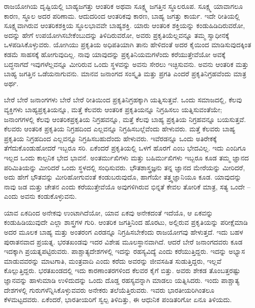 \vskip 5pt

ರಾಜಯೋಗಿಯ ದೃಷ್ಟಿಯಲ್ಲಿ ಬಾಹ್ಯಜಗತ್ತು ಆಂತರಿಕ ಅಥವಾ ಸೂಕ್ಷ್ಮ ಜಗತ್ತಿನ ಸ್ಥೂಲರೂಪ. ಸೂಕ್ಷ್ಮ ಯಾವಾಗಲೂ ಕಾರಣ, ಸ್ಥೂಲ ಅದರ ಪರಿಣಾಮ. ಆದುದರಿಂದ ಆಂತರಿಕವು ಕಾರಣ, ಬಾಹ್ಯ ಜಗತ್ತು ಕಾರ್ಯ. ಇದೇ ರೀತಿಯಲ್ಲಿ ಸೂಕ್ಷ್ಮವಾಗಿರುವ ಆಂತರಿಕಶಕ್ತಿಯ ಸ್ಥೂಲಭಾವವೇ ಬಾಹ್ಯಶಕ್ತಿ. ಯಾರು ಆಂತರಿಕ ಶಕ್ತಿಯನ್ನು ಕಂಡುಹಿಡಿದಿರುವರೋ, ಅದನ್ನು ಹೇಗೆ ಉಪಯೋಗಿಸಬೇಕೆಂಬುದನ್ನು ತಿಳಿದಿರುವರೋ, ಅವರು ಪ್ರಕೃತಿಯೆಲ್ಲವನ್ನೂ ತಮ್ಮ ಸ್ವಾಧೀನಕ್ಕೆ ಒಳಪಡಿಸಿಕೊಳ್ಳುವರು. ಯೋಗಿಯು ಪ್ರಕೃತಿಯ ಅಧಿಪತಿಯಾಗಿ ತಾನು ಹೇಳಿದಂತೆ ಅದರ ಕೈಯಿಂದ ಮಾಡಿಸುವುದಕ್ಕಿಂತ ಕಡಮೆ ಸಾಹಸಕ್ಕೆ ಹೋಗುವುದಿಲ್ಲ. ನಾವು ಯಾವುದನ್ನು ಪ್ರಕೃತಿನಿಯಮಗಳೆಂದು ಕರೆಯುತ್ತೇವೆಯೋ ಅವಕ್ಕೆ ಬದ್ಧನಾಗದೆ ಇವುಗಳೆಲ್ಲವನ್ನೂ ಮೀರಿರುವ ಒಂದು ಸ್ಥಳವನ್ನು ಅವನು ಸೇರಲು ಇಚ್ಛಿಸುವನು. ಅವನು ಆಂತರಿಕ ಮತ್ತು ಬಾಹ್ಯ ಜಗತ್ತಿನ ಒಡೆಯನಾಗುವನು. ಮಾನವ ಜನಾಂಗದ ಸಂಸ್ಕೃತಿ ಮತ್ತು ಪ್ರಗತಿ ಎಂದರೆ ಪ್ರಕೃತಿನಿಗ್ರಹವೆಂದು ಮಾತ್ರ ಅರ್ಥ. 

\vskip 6pt

ಬೇರೆ ಬೇರೆ ಜನಾಂಗಗಳು ಬೇರೆ ಬೇರೆ ರೀತಿಯಿಂದ ಪ್ರಕೃತಿನಿಗ್ರಹಕ್ಕಾಗಿ ಯತ್ನಿಸುತ್ತವೆ. ಒಂದು ಸಮಾಜದಲ್ಲಿ, ಕೆಲವು ವ್ಯಕ್ತಿಗಳು ಬಾಹ್ಯಪ್ರಕೃತಿಯನ್ನೂ, ಮತ್ತೆ ಕೆಲವರು ಆಂತರಿಕ ಪ್ರಕೃತಿಯನ್ನೂ ನಿಗ್ರಹಿಸಲು ಯತ್ನಿಸುವಂತೆಯೇ; ಜನಾಂಗಗಳಲ್ಲಿ ಕೆಲವು ಆಂತರಿಕಪ್ರಕೃತಿಯ ನಿಗ್ರಹವನ್ನೂ, ಮತ್ತೆ ಕೆಲವು ಬಾಹ್ಯ ಪ್ರಕೃತಿಯ ನಿಗ್ರಹವನ್ನೂ ಬಯಸುತ್ತವೆ. ಕೆಲವರು ಆಂತರಿಕ ಪ್ರಕೃತಿಯ ನಿಗ್ರಹದಿಂದ ಎಲ್ಲವನ್ನೂ ನಿಗ್ರಹಿಸಬಲ್ಲೆವೆಂದು ಹೇಳುವರು. ಮತ್ತೆ ಕೆಲವರು ಬಾಹ್ಯ ಪ್ರಕೃತಿಯ ನಿಗ್ರಹದಿಂದ ಎಲ್ಲವನ್ನೂ ನಿಗ್ರಹಿಸಬಹುದೆಂದು ಹೇಳುವರು. ಇವೆರಡನ್ನೂ ಒಂದು ಅತಿರೇಕಕ್ಕೆ ತೆಗೆದುಕೊಂಡುಹೋದರೆ ಇಬ್ಬರೂ ಸರಿ. ಏಕೆಂದರೆ ಪ್ರಕೃತಿಯಲ್ಲಿ ಒಳಗೆ ಹೊರಗೆ ಎಂಬ ಭೇದವಿಲ್ಲ. ಇದು ಎಂದಿಗೂ ಇಲ್ಲದ ಒಂದು ಕಾಲ್ಪನಿಕ ಭೇದ ಭಾವನೆ. ಅಂತರ್ಮುಖಿಗಳು ಮತ್ತು ಬಹಿರ್ಮುಖಿಗಳು ಇಬ್ಬರೂ ಕೂಡ ತಮ್ಮ ಜ್ಞಾನದ ಪರಿಮಿತಿಯನ್ನು ಮೀರಿದರೆ ಒಂದು ಸ್ಥಳದಲ್ಲಿ ಸಂಧಿಸುವರು. ಭೌತಶಾಸ್ತ್ರಜ್ಞನು ತನ್ನ ಜ್ಞಾನದ ಮೇರೆಯನ್ನು ಮೀರಿದರೆ, ಅದು ಹೇಗೆ ಭೌತವನ್ನು ಮೀರಿಹೋಗುವಂತೆ ಕಂಡುಬರುವುದೊ, ಹಾಗೆಯೇ ತತ್ತ್ವಜ್ಞಾನಿಯೂ ಕೂಡ. ಯಾವುದನ್ನು ನಾವು ಜಡ ಮತ್ತು ಚೇತನ ಎಂದು ಕರೆಯುತ್ತೇವೆಯೊ ಅವುಗಳಿಗಿರುವ ಭಿನ್ನತೆ ಕೇವಲ ತೋರಿಕೆ ಮಾತ್ರ, ಸತ್ಯ ಒಂದೇ – ಎಂದು ಅವನು ಕಂಡುಕೊಳ್ಳುವನು. 

\vskip 6pt

ಯಾವ ಏಕದಿಂದ ಅನೇಕವು ಉಂಟಾಗಿದೆಯೋ, ಯಾವ ಏಕವು ಅನೇಕದಂತೆ ಇದೆಯೊ, ಆ ಏಕವನ್ನು ಕಂಡುಹಿಡಿಯುವುದೇ ಎಲ್ಲಾ ಶಾಸ್ತ್ರಗಳ ಗುರಿ. ಆಂತರಿಕ ಜಗತ್ತಿನಿಂದ ಹೊರಟು, ಅಲ್ಲಿರುವ ಪ್ರಕೃತಿಯನ್ನು ಪರೀಕ್ಷೆಮಾಡಿ ಅದರ ಮೂಲಕ ಬಾಹ್ಯ ಮತ್ತು ಅಂತರಂಗ ಎರಡನ್ನೂ ನಿಗ್ರಹಿಸಬೇಕೆಂದು ರಾಜಯೋಗವು ಹೇಳುತ್ತದೆ. ಇದು ಬಹಳ ಪುರಾತನವಾದ ಪ್ರಯತ್ನ. ಭರತಖಂಡವು ಇದರ ವಿಶೇಷ ಮೂಲಸ್ಥಾನವಾಗಿದೆ. ಆದರೆ ಬೇರೆ ಜನಾಂಗದವರು ಕೂಡ ಇದಕ್ಕಾಗಿ ಪ್ರಯತ್ನಪಟ್ಟಿರುವರು. ಪಾಶ್ಚಾತ್ಯದೇಶಗಳಲ್ಲಿ ಇದನ್ನು ರಹಸ್ಯವಿದ್ಯೆ ಎಂದು ಕರೆಯುತ್ತಿದ್ದರು. ಇದನ್ನು ಅಭ್ಯಾಸ ಮಾಡುವವರನ್ನು ಮಾಟಗಾತಿ, ಮಂತ್ರವಾದಿ ಎಂದು ಕರೆದು ಅವರನ್ನು ಜೀವಸಹಿತ ಸುಡುತ್ತಿದ್ದರು, ಇಲ್ಲವೆ ಕೊಲ್ಲುತ್ತಿದ್ದರು. ಭರತಖಂಡದಲ್ಲಿ ಇದು ಕಾರಣಾಂತರಗಳಿಂದ ಕೆಲವರ ಕೈಗೆ ಬಿತ್ತು. ಅವರು ಶೇಕಡ ತೊಂಬತ್ತರಷ್ಟು ಜ್ಞಾನವನ್ನು ಹಾಳುಮಾಡಿ ಉಳಿದುದನ್ನು ಒಂದು ದೊಡ್ಡ ರಹಸ್ಯವನ್ನಾಗಿ ಮಾಡಲು ಯತ್ನಿಸಿದರು. ಇಂದು ಪಾಶ್ಚಾತ್ಯ ದೇಶಗಳಲ್ಲಿ ಗುರುಗಳೆನ್ನಿಸಿಕೊಳ್ಳುವವರು ಅನೇಕರು ತಲೆಯೆತ್ತಿರುವರು. ಇವರು ಭಾರತೀಯರಿಗಿಂತಲೂ ಕೆಳಮಟ್ಟದವರು. ಏಕೆಂದರೆ, ಭಾರತೀಯರಿಗೆ ಸ್ವಲ್ಪ ತಿಳಿದಿತ್ತು, ಈ ಆಧುನಿಕ ಪಂಡಿತರಿಗೋ ಏನೂ ತಿಳಿಯದು. 

